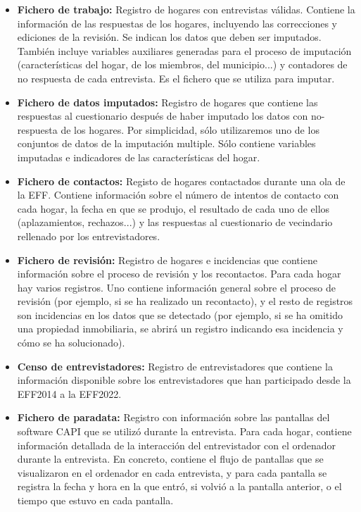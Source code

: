 \begin{itemize}
    \item \textbf{Fichero de trabajo:} Registro de hogares con entrevistas válidas. Contiene la información de las respuestas de los hogares, incluyendo las correcciones y ediciones de la revisión. Se indican los datos que deben ser imputados. También incluye variables auxiliares generadas para el proceso de imputación (características del hogar, de los miembros, del municipio...) y contadores de no respuesta de cada entrevista. Es el fichero que se utiliza para imputar.
    \item \textbf{Fichero de datos imputados:} Registro de hogares que contiene las respuestas al cuestionario después de haber imputado los datos con no-respuesta de los hogares. Por simplicidad, sólo utilizaremos uno de los conjuntos de datos de la imputación multiple. Sólo contiene variables imputadas e indicadores de las características del hogar.
    \item \textbf{Fichero de contactos:} Registo de hogares contactados durante una ola de la EFF. Contiene información sobre el número de intentos de contacto con cada hogar, la fecha en que se produjo, el resultado de cada uno de ellos (aplazamientos, rechazos...) y las respuestas al cuestionario de vecindario rellenado por los entrevistadores.
    \item \textbf{Fichero de revisión:} Registro de hogares e incidencias que contiene información sobre el proceso de revisión y los recontactos. Para cada hogar hay varios registros. Uno contiene información general sobre el proceso de revisión (por ejemplo, si se ha realizado un recontacto), y el resto de registros son incidencias en los datos que se detectado (por ejemplo, si se ha omitido una propiedad inmobiliaria, se abrirá un registro indicando esa incidencia y cómo se ha solucionado).
    \item \textbf{Censo de entrevistadores:} Registro de entrevistadores que contiene la información disponible sobre los entrevistadores que han participado desde la EFF2014 a la EFF2022.
    \item \textbf{Fichero de paradata:} Registro con información sobre las pantallas del software CAPI que se utilizó durante la entrevista. Para cada hogar, contiene información detallada de la interacción del entrevistador con el ordenador durante la entrevista. En concreto, contiene el flujo de pantallas que se visualizaron en el ordenador en cada entrevista, y para cada pantalla se registra la fecha y hora en la que entró, si volvió a la pantalla anterior, o el tiempo que estuvo en cada pantalla.
\end{itemize}

